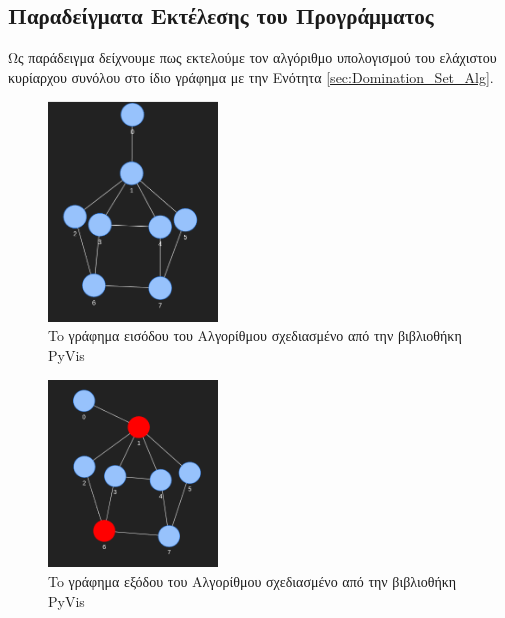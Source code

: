 \subsection{Παραδείγματα Εκτέλεσης του Προγράμματος}

Ως παράδειγμα δείχνουμε πως εκτελούμε τον αλγόριθμο υπολογισμού του ελάχιστου κυρίαρχου συνόλου στο ίδιο γράφημα με την Ενότητα \ref{sec:Domination_Set_Alg}. 

\begin{figure}[H]
	\centering
	\includegraphics[width=0.4\textwidth]{pictures/at-free-graph-pyvis.png} 
	\caption{To γράφημα εισόδου του Αλγορίθμου σχεδιασμένο από την βιβλιοθήκη PyVis}
\end{figure}




\begin{figure}[H]
	\centering
	\includegraphics[width=0.4\textwidth]{pictures/at-free-graph-domi-output-pyvis.png} 
	\caption{To γράφημα εξόδου του Αλγορίθμου σχεδιασμένο από την βιβλιοθήκη PyVis}
\end{figure}

